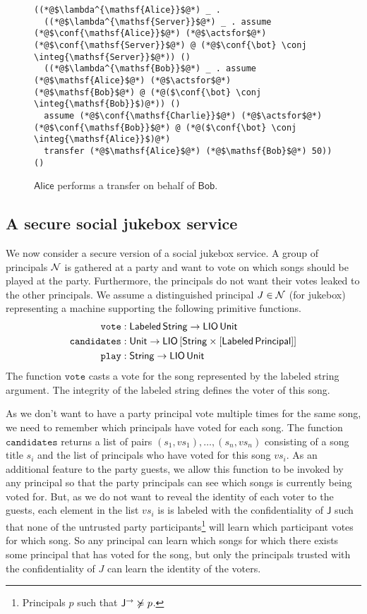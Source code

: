 \begin{figure}
\centering
\begin{lstlisting}
((*@$\lambda^{\mathsf{Alice}}$@*) _ .
  ((*@$\lambda^{\mathsf{Server}}$@*) _ . assume (*@$\conf{\mathsf{Alice}}$@*) (*@$\actsfor$@*) (*@$\conf{\mathsf{Server}}$@*) @ (*@$\conf{\bot} \conj \integ{\mathsf{Server}}$@*)) ()
  ((*@$\lambda^{\mathsf{Bob}}$@*) _ . assume (*@$\mathsf{Alice}$@*) (*@$\actsfor$@*) (*@$\mathsf{Bob}$@*) @ (*@($\conf{\bot} \conj \integ{\mathsf{Bob}}$)@*)) ()
  assume (*@$\conf{\mathsf{Charlie}}$@*) (*@$\actsfor$@*) (*@$\conf{\mathsf{Bob}}$@*) @ (*@($\conf{\bot} \conj \integ{\mathsf{Alice}}$)@*)
  transfer (*@$\mathsf{Alice}$@*) (*@$\mathsf{Bob}$@*) 50)) ()
\end{lstlisting}
\caption{$\mathsf{Alice}$ performs a transfer on behalf of $\mathsf{Bob}$.}
\label{fig:sec-bank-alice-banks-for-bob}
\end{figure}

\subsection{A secure social jukebox service}
We now consider a secure version of a social jukebox service. A group of principals $\mathcal{N}$ is gathered at a party and want to vote on which songs should be played at the party. Furthermore, the principals do not want their votes leaked to the other principals. We assume a distinguished principal $J \in \mathcal{N}$ (for jukebox) representing a machine supporting the following primitive functions.
\begin{align*}
\mathtt{vote}&: \mathsf{Labeled}\,\mathsf{String} \to \mathsf{LIO}\,\mathsf{Unit}\\
\mathtt{candidates}&: \mathsf{Unit} \to \mathsf{LIO}\,\lbrack\mathsf{String} \times \lbrack\mathsf{Labeled}\,\mathsf{Principal}\rbrack\rbrack\\
\mathtt{play}&: \mathsf{String} \to \mathsf{LIO}\,\mathsf{Unit}
\end{align*}
The function $\mathtt{vote}$ casts a vote for the song represented by the labeled string argument. The integrity of the labeled string defines the voter of this song.

As we don't want to have a party principal vote multiple times for the same song, we need to remember which principals have voted for each song. The function $\mathtt{candidates}$ returns a list of pairs $(s_1, \mathit{vs}_1), \dots, (s_n, {\mathit{vs}}_n)$ consisting of a song title $s_i$ and the list of principals who have voted for this song $\mathit{vs}_i$. As an additional feature to the party guests, we allow this function to be invoked by any principal so that the party principals can see which songs is currently being voted for. But, as we do not want to reveal the identity of each voter to the guests, each element in the list $\mathit{vs}_i$ is is labeled with the confidentiality of $\mathsf{J}$ such that none of the untrusted party participants\footnote{Principals $p$ such that $\mathsf{J}^{\rightarrow} \not\succcurlyeq p$.} will learn which participant votes for which song. So any principal can learn which songs for which there exists some principal that has voted for the song, but only the principals trusted with the confidentiality of $J$ can learn the identity of the voters.

